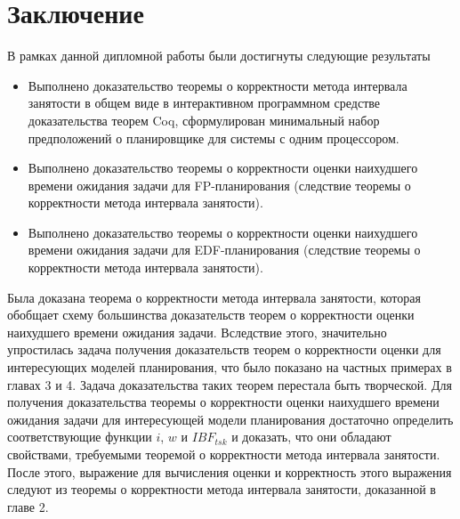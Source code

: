 \documentclass[14pt]{matmex-diploma-custom}
\begin{document}
\section*{Заключение}
В рамках данной дипломной работы были достигнуты следующие результаты
\begin{itemize}
    \item Выполнено доказательство теоремы о корректности метода интервала занятости в общем виде в интерактивном программном средстве доказательства теорем Coq, сформулирован минимальный набор предположений о планировщике для системы с одним процессором.
    \item Выполнено доказательство теоремы о корректности оценки наихудшего времени ожидания задачи для FP-планирования (следствие теоремы о корректности метода интервала занятости).
    \item Выполнено доказательство теоремы о корректности оценки наихудшего времени ожидания задачи для EDF-планирования (следствие теоремы о корректности метода интервала занятости).    
\end{itemize}

Была доказана теорема о корректности метода интервала занятости, которая обобщает 
  схему большинства доказательств теорем о корректности оценки наихудшего времени ожидания задачи.
  Вследствие этого, значительно упростилась задача получения доказательств теорем 
  о корректности оценки для интересующих моделей планирования, что было 
  показано на частных примерах в главах 3 и 4. Задача доказательства таких теорем перестала
  быть творческой. Для получения доказательства теоремы о корректности оценки
  наихудшего времени ожидания задачи для интересующей модели
  планирования достаточно определить соответствующие функции $i$, $w$ и $IBF_{tsk}$
  и доказать, что они обладают свойствами, требуемыми теоремой о корректности метода интервала занятости. 
  После этого, выражение для 
  вычисления оценки и корректность этого выражения следуют из теоремы о корректности 
  метода интервала занятости, доказанной в главе 2.

\setmonofont[Mapping=tex-text]{CMU Typewriter Text}


\end{document}
